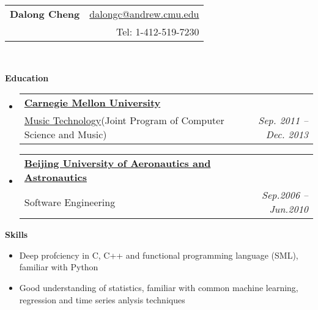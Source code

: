\documentclass[letterpaper,11pt]{article}
\makeatletter
\newcommand{\resheading}[1]{{\large \colorbox{mygrey}{\begin{minipage}{\textwidth}{\textbf{#1 \vphantom{p\^{E}}}}\end{minipage}}}}
\newcommand{\ressubheading}[4]{
\begin{tabular*}{6.5in}{l@{\extracolsep{\fill}}r}
		\textbf{#1} & #2 \\
		{#3}{} & \textit{#4} \\
\end{tabular*}\vspace{-6pt}}
\makeatother
\begin{document}
\newcommand{\mywebheader}{
\begin{tabular*}{7in}{l@{\extracolsep{\fill}}r}
	\textbf{\LARGE Dalong Cheng} & \href{mailto:dalongc@andrew.cmu.edu}{dalongc@andrew.cmu.edu}\\
	{\footnotesize \texttt{}} & {Tel: 1-412-519-7230} \\
	\end{tabular*}
\\
\vspace{0.1in}}

\mywebheader

\resheading{Education}
  \begin{itemize}
		\item
      \ressubheading{\href{http://www.cmu.edu}{Carnegie Mellon University}}{} 
      {\href{http://www.cs.cmu.edu/~music/mat/}{Music Technology}{\small (Joint Program of Computer Science and Music)}}
      {Sep. 2011 -- Dec. 2013}
    \item	
      \ressubheading{\href{http://ev.buaa.edu.cn}{Beijing University of Aeronautics and Astronautics}}
      {}{Software Engineering}{Sep.2006 -- Jun.2010}
	\end{itemize}

\resheading{{Skills}}
  \begin{itemize}
		\item{\small Deep profciency in C, C++ and functional programming language (SML), familiar with Python}
		\item{\small Good understanding of statistics, familiar with common machine learning, regression and time series anlysis techniques}
	\end{itemize}
\end{document}
